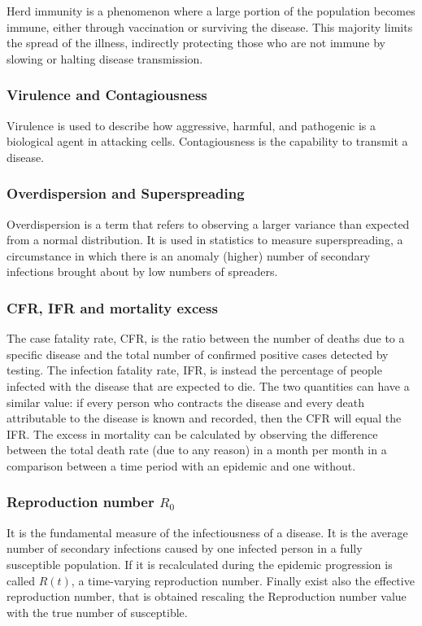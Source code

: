 Herd immunity is a phenomenon where a large portion of the population becomes immune, either through vaccination or surviving the disease. This majority limits the spread of the illness, indirectly protecting those who are not immune by slowing or halting disease transmission.

\subsubsection{Virulence and Contagiousness}  Virulence is used to describe how aggressive, harmful, and pathogenic is a biological agent in attacking cells. Contagiousness is the capability to transmit a disease. 

\subsubsection{Overdispersion and Superspreading} Overdispersion is a term that refers to observing a larger variance than expected from a normal distribution. It is used in statistics to measure superspreading, a circumstance in which there is an anomaly (higher) number of secondary infections brought about by low numbers of spreaders.

\subsubsection{CFR, IFR and mortality excess} The case fatality rate, CFR, is the ratio between the number of deaths due to a specific disease and the total number of confirmed positive cases detected by testing. 
The infection fatality rate, IFR, is instead the percentage of people infected with the disease that are expected to die. The two quantities can have a similar value: if every person who contracts the disease and every death attributable to the disease is known and recorded, then the CFR will equal the IFR.
The excess in mortality can be calculated by observing the difference between the total death rate (due to any reason) in a month per month in a comparison between a time period with an epidemic and one without. 

\subsubsection{Reproduction number $R_0$} It is the fundamental measure of the infectiousness of a disease. It is the average number of secondary infections caused by one infected person in a fully susceptible population. If it is recalculated during the epidemic progression is called $R(t)$, a time-varying reproduction number. Finally exist also the effective reproduction number, that is obtained
rescaling the Reproduction number value with the true number of susceptible.

